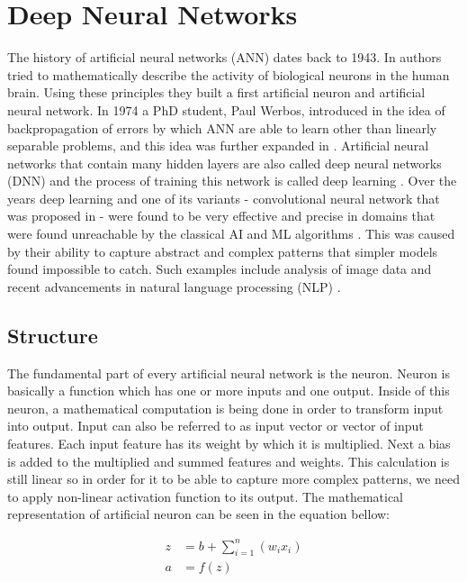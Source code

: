 \chapter{Deep Neural Networks}

The history of artificial neural networks (ANN) dates back to 1943. In \cite{McCulloch1943} authors tried to mathematically describe the activity of biological neurons in the human brain. Using these principles they built a first artificial neuron and artificial neural network. In 1974 a PhD student, Paul Werbos, introduced in \cite{Werbos1974} the idea of backpropagation of errors by which ANN are able to learn other than linearly separable problems, and this idea was further expanded in \cite{Rumelhart1986}. Artificial neural networks that contain many hidden layers are also called deep neural networks (DNN) and the process of training this network is called deep learning \cite{LeCun2015}. Over the years deep learning and one of its variants - convolutional neural network that was proposed in \cite{LeCun2015-2} - were found to be very effective and precise in domains that were found unreachable by the classical AI and ML algorithms \cite{LeCun2015}. This was caused by their ability to capture abstract and complex patterns that simpler models found impossible to catch. Such examples include analysis of image data \cite{Farabet2013, Alzubaidi2021} and recent advancements in natural language processing (NLP) \cite{Deng2018}.

\section{Structure}
The fundamental part of every artificial neural network is the neuron. Neuron is basically a function which has one or more inputs and one output. Inside of this neuron, a mathematical computation is being done in order to transform input into output. Input can also be referred to as input vector or vector of input features. Each input feature has its weight by which it is multiplied. Next a bias is added to the multiplied and summed features and weights. This calculation is still linear so in order for it to be able to capture more complex patterns, we need to apply non-linear activation function to its output. The mathematical representation of artificial neuron can be seen in the equation bellow:

\begin{align}
    z &= b + \sum_{i=1}^n (w_i x_i) \\
    a &= f(z)
\end{align}

